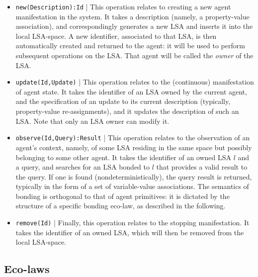 \documentclass[12pt,a4paper,twoside,openright]{book}
\begin{document}
\begin{itemize}
 \item \texttt{new(Description):Id} | This operation relates to creating a new agent manifestation in the system. It takes a description (namely, a property-value association), and correspondingly generates a new LSA and inserts it into the local LSA-space. A new identifier, associated to that LSA, is then automatically created and returned to the agent: it will be used to perform subsequent operations on the LSA. That agent will be called the \emph{owner} of the LSA.
 
 \item \texttt{update(Id,Update)} | This operation relates to the (continuous) manifestation of agent state. It takes the identifier of an LSA owned by the current agent, and the specification of an update to its current description (typically, property-value re-assignments), and it updates the description of such an LSA. Note that only an LSA owner can modify it. 
 
 \item \texttt{observe(Id,Query):Result} | This operation relates to the  observation of an agent's context, namely, of some LSA residing in the same space but possibly belonging to some other agent. It takes the identifier of an owned LSA $l$ and a query, and searches for an LSA bonded to $l$ that provides a valid result to the query. If one is found (nondeterministically), the query result is returned, typically in the form of a set of variable-value associations. The semantics of bonding is orthogonal to that of agent primitives: it is dictated by the structure of a specific bonding eco-law, as described in the following. %
 
 \item \texttt{remove(Id)} | Finally, this operation relates to the stopping manifestation. It takes the identifier of an owned LSA, which will then be removed from the local LSA-space.
 
\end{itemize}

\subsection{Eco-laws}\label{s:ecolaws}
\end{document}
